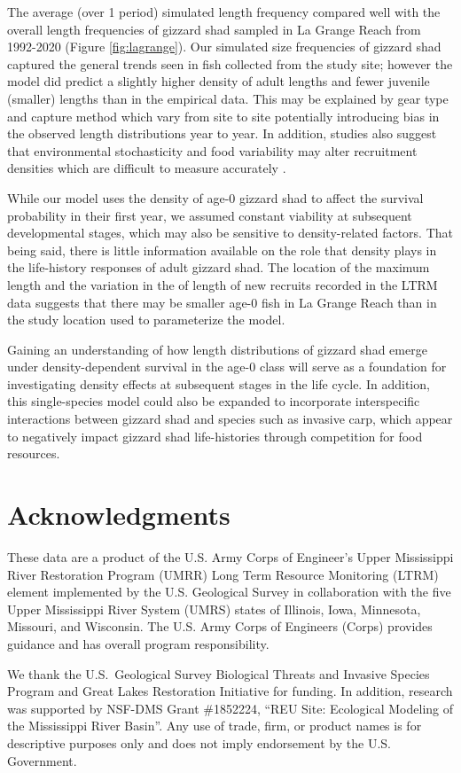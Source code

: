 \documentclass[preprint,review,12pt,authoryear]{elsarticle}
\begin{document}
The average (over 1 period) simulated length frequency compared well with the overall length frequencies of gizzard shad sampled in La Grange Reach from 1992-2020 (Figure \ref{fig:lagrange}). 
Our simulated size frequencies of gizzard shad captured the general trends seen in fish collected from the study site; however the model did predict a slightly higher density of adult lengths and fewer juvenile (smaller) lengths than in the empirical data. 
This may be explained by gear type and capture method which vary from site to site potentially introducing bias in the observed length distributions year to year.
In addition, studies also suggest that environmental stochasticity and food variability may alter recruitment densities which are difficult to measure accurately \citep{rose2000quantitative, okamoto2016stochastic}. 

While our model uses the density of age-0 gizzard shad to affect the survival probability in their first year, we assumed constant viability at subsequent developmental stages, which may also be sensitive to density-related factors.  
That being said, there is little information available on the role that density plays in the life-history responses of adult gizzard shad. 
The location of the maximum length and the variation in the of length of new recruits recorded in the LTRM data suggests that there may be smaller age-0 fish in La Grange Reach than in the study location \citep{michaletz2017variation} used to parameterize the model.  

Gaining an understanding of how length distributions of gizzard shad emerge under density-dependent survival in the age-0 class will serve as a foundation for investigating density effects at subsequent stages in the life cycle.  
In addition, this single-species model could also be expanded to incorporate interspecific interactions between gizzard shad and species such as invasive carp, which appear to negatively impact gizzard shad life-histories through competition for food resources.   

\section{Acknowledgments}

These data are a product of the U.S. Army Corps of Engineer's Upper Mississippi River Restoration Program (UMRR) Long Term Resource Monitoring (LTRM) element implemented by the U.S. Geological Survey in collaboration with the five Upper Mississippi River System (UMRS) states of Illinois, Iowa, Minnesota, Missouri, and Wisconsin.
The U.S. Army Corps of Engineers (Corps) provides guidance and has overall program responsibility.

We thank the U.S.~Geological Survey  Biological Threats and Invasive Species Program and Great Lakes Restoration Initiative for funding.
In addition, research was supported by NSF-DMS Grant \#1852224, ``REU Site: Ecological Modeling of the Mississippi River Basin''. Any use of trade, firm, or product names is for descriptive purposes only and does not imply endorsement by the U.S. Government.

  
 
\end{document}
